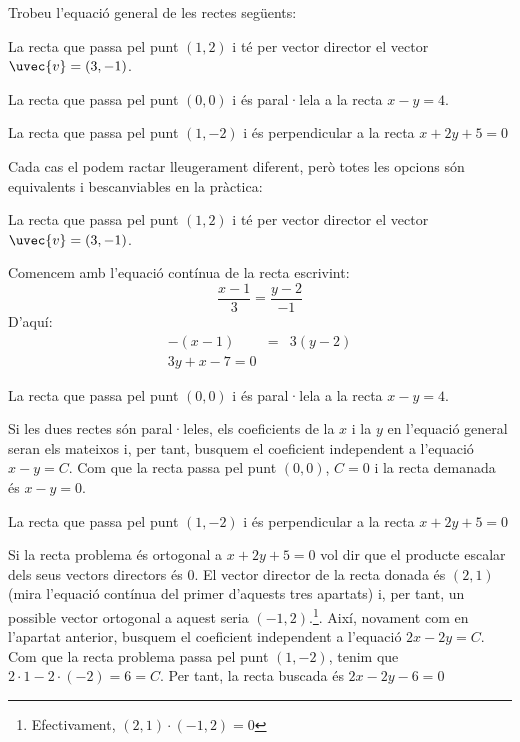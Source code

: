 \Exercise Trobeu l'equació general de les rectes següents:
\begin{llista}
  \item La recta que passa pel punt $(1,2)$ i té per vector director el vector $\uvec{v}=(3,-1)$.
  \item La recta que passa pel punt $(0,0)$ i és paral·lela a la recta $x-y=4$.
  \item La recta que passa pel punt $(1,-2)$ i és perpendicular a la recta $x+2y+5=0$
\end{llista}

\Answer Cada cas el podem ractar lleugerament diferent, però totes les opcions són equivalents i bescanviables en la pràctica:
\begin{llista}
  \item La recta que passa pel punt $(1,2)$ i té per vector director el vector $\uvec{v}=(3,-1)$.
 
  Comencem amb l'equació contínua de la recta escrivint:
  \[
  \frac{x-1}{3}=\frac{y-2}{-1}
  \]
  D'aquí:
  \begin{eqnarray*}
    -(x-1)&=&3(y-2)\\
    3y+x-7=0
  \end{eqnarray*}

  \item La recta que passa pel punt $(0,0)$ i és paral·lela a la recta $x-y=4$.

  Si les dues rectes són paral·leles, els coeficients de la $x$ i la $y$ en l'equació general seran els mateixos i, per tant, busquem el coeficient independent a l'equació $x-y=C$. Com que la recta passa pel punt $(0,0)$, $C=0$ i la recta demanada és $x-y=0$.

  \item La recta que passa pel punt $(1,-2)$ i és perpendicular a la recta $x+2y+5=0$

  Si la recta problema és ortogonal a $x+2y+5=0$ vol dir que el producte escalar dels seus vectors directors és $0$. El vector director de la recta donada és $(2,1)$ (mira l'equació contínua del primer d'aquests tres apartats) i, per tant, un possible vector ortogonal a aquest seria $(-1,2)$.\footnote{Efectivament, $(2,1)\cdot(-1,2)=0$}. Així, novament com en l'apartat anterior, busquem el coeficient independent a l'equació $2x-2y=C$. Com que la recta problema passa pel punt $(1,-2)$, tenim que $2\cdot1-2\cdot(-2)=6=C$. Per tant, la recta buscada és $2x-2y-6=0$

\end{llista}
\blacksquare
